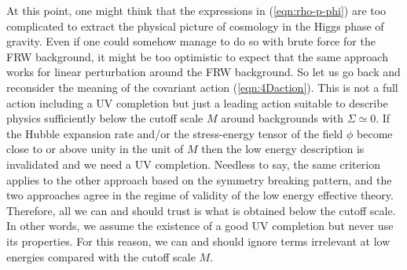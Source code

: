 At this point, one might think that the expressions in
(\ref{eqn:rho-p-phi}) are too complicated to extract the physical
picture of cosmology in the Higgs phase of gravity. Even if one could
somehow manage to do so with brute force for the FRW background, it
might be too optimistic to expect that the same approach works for 
linear perturbation around the FRW background. So let us go back and
reconsider the meaning of the covariant action (\ref{eqn:4Daction}). 
This is not a full action including a UV completion but just a leading
action suitable to describe physics sufficiently below the cutoff scale
$M$ around backgrounds with $\Sigma\simeq 0$. If the Hubble expansion
rate and/or the stress-energy tensor of the field $\phi$ become close to
or above unity in the unit of $M$ then the low energy description is
invalidated and we need a UV 
completion. Needless to say, the same criterion applies to the other
approach based on the symmetry breaking pattern, and the two
approaches agree in the regime of validity of the low energy effective
theory. Therefore, all we can and should trust is what is obtained below
the cutoff scale. In other words, we assume the existence of a good UV
completion but never use its properties. For this reason, we can and
should ignore terms irrelevant at low energies compared with the cutoff
scale $M$.  


